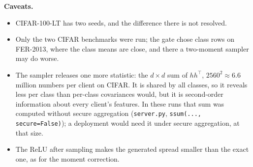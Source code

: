 \documentclass[11pt,a4paper]{article}
\renewcommand{\paragraph}[1]{\par\medskip\noindent\textbf{#1.}\enspace}
\begin{document}
\paragraph{Caveats}
\begin{itemize}
\item CIFAR-100-LT has two seeds, and the difference there is not resolved.
\item Only the two CIFAR benchmarks were run; the gate chose class rows on FER-2013, where the class means are close,
and there a two-moment sampler may do worse.
\item The sampler releases one more statistic: the $d\times d$ sum of $hh^\top$, $2560^2\approx6.6$ million numbers
per client on CIFAR. It is shared by all classes, so it reveals less per class than per-class covariances would, but
it is second-order information about every client's features. In these runs that sum was computed without secure
aggregation (\texttt{server.py}, \texttt{ssum(..., secure=False)}); a deployment would need it under secure
aggregation, at that size.
\item The ReLU after sampling makes the generated spread smaller than the exact one, as for the moment correction.
\end{itemize}
\end{document}
